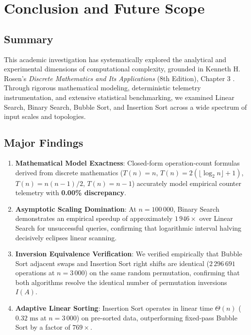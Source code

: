 \documentclass[11pt,a4paper,oneside]{report}
\theoremstyle{definition}
\begin{document}
\chapter{Conclusion and Future Scope}
\label{chap:conclusion}

\section{Summary}
This academic investigation has systematically explored the analytical and experimental dimensions of computational complexity, grounded in Kenneth H. Rosen's \emph{Discrete Mathematics and Its Applications} (8th Edition), Chapter 3 \cite{rosen2019discrete}. Through rigorous mathematical modeling, deterministic telemetry instrumentation, and extensive statistical benchmarking, we examined Linear Search, Binary Search, Bubble Sort, and Insertion Sort across a wide spectrum of input scales and topologies.

\section{Major Findings}
\begin{enumerate}
    \item \textbf{Mathematical Model Exactness}: Closed-form operation-count formulas derived from discrete mathematics ($T(n) = n$, $T(n) = 2(\lfloor \log_2 n \rfloor + 1)$, $T(n) = n(n-1)/2$, $T(n) = n - 1$) accurately model empirical counter telemetry with \textbf{0.00\% discrepancy}.
    \item \textbf{Asymptotic Scaling Domination}: At $n = 100\,000$, Binary Search demonstrates an empirical speedup of approximately \textbf{$1\,946\times$} over Linear Search for unsuccessful queries, confirming that logarithmic interval halving decisively eclipses linear scanning.
    \item \textbf{Inversion Equivalence Verification}: We verified empirically that Bubble Sort adjacent swaps and Insertion Sort right shifts are identical ($2\,296\,691$ operations at $n = 3\,000$) on the same random permutation, confirming that both algorithms resolve the identical number of permutation inversions $I(A)$.
    \item \textbf{Adaptive Linear Sorting}: Insertion Sort operates in linear time $\Theta(n)$ ($0.32\text{ ms}$ at $n = 3\,000$) on pre-sorted data, outperforming fixed-pass Bubble Sort by a factor of \textbf{$769\times$}.
\end{enumerate}
\end{document}
